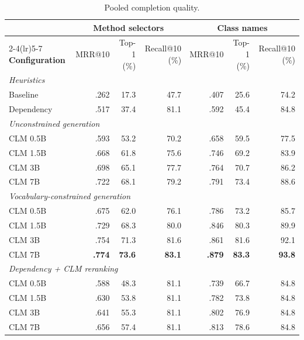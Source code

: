 \ifdefined\mainpaperresults
\begin{table}[t]
\centering
\caption{Pooled completion quality.}
\label{tab:mrr-by-prefix}
\setlength{\tabcolsep}{7pt}
\small
\begin{tabular}{lrrr@{\hspace{16pt}}rrr}
\toprule
 & \multicolumn{3}{c}{\textbf{Method selectors}} & \multicolumn{3}{c}{\textbf{Class names}} \\
\cmidrule(lr){2-4}\cmidrule(lr){5-7}
\textbf{Configuration} & MRR@10 & Top-1 (\%) & Recall@10 (\%) & MRR@10 & Top-1 (\%) & Recall@10 (\%) \\
\midrule
\multicolumn{7}{l}{\textit{Heuristics}} \\
Baseline & .262 & 17.3 & 47.7 & .407 & 25.6 & 74.2 \\
Dependency & .517 & 37.4 & 81.1 & .592 & 45.4 & 84.8 \\
\midrule
\multicolumn{7}{l}{\textit{Unconstrained generation}} \\
CLM 0.5B & .593 & 53.2 & 70.2 & .658 & 59.5 & 77.5 \\
CLM 1.5B & .668 & 61.8 & 75.6 & .746 & 69.2 & 83.9 \\
CLM 3B & .698 & 65.1 & 77.7 & .764 & 70.7 & 86.2 \\
CLM 7B & .722 & 68.1 & 79.2 & .791 & 73.4 & 88.6 \\
\midrule
\multicolumn{7}{l}{\textit{Vocabulary-constrained generation}} \\
CLM 0.5B & .675 & 62.0 & 76.1 & .786 & 73.2 & 85.7 \\
CLM 1.5B & .729 & 68.3 & 80.0 & .846 & 80.3 & 89.9 \\
CLM 3B & .754 & 71.3 & 81.6 & .861 & 81.6 & 92.1 \\
CLM 7B & \textbf{.774} & \textbf{73.6} & \textbf{83.1} & \textbf{.879} & \textbf{83.3} & \textbf{93.8} \\
\midrule
\multicolumn{7}{l}{\textit{Dependency + CLM reranking}} \\
CLM 0.5B & .588 & 48.3 & 81.1 & .739 & 66.7 & 84.8 \\
CLM 1.5B & .630 & 53.8 & 81.1 & .782 & 73.8 & 84.8 \\
CLM 3B & .641 & 55.3 & 81.1 & .802 & 76.9 & 84.8 \\
CLM 7B & .656 & 57.4 & 81.1 & .813 & 78.6 & 84.8 \\
\bottomrule
\end{tabular}
\end{table}
